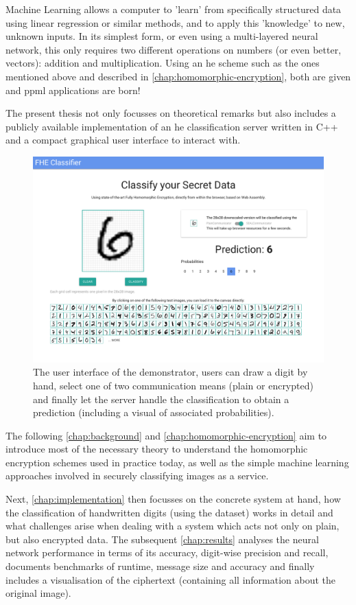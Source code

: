 Machine Learning allows a computer to 'learn' from specifically structured data using linear regression or similar methods, and to apply this 'knowledge' to new, unknown inputs.
In its simplest form, or even using a multi-layered neural network, this only requires two different operations on numbers (or even better, vectors): addition and multiplication.
Using an \gls{he} scheme such as the ones mentioned above and described in \autoref{chap:homomorphic-encryption}, both are given and \gls{ppml} applications are born!

The present thesis not only focusses on theoretical remarks but also includes a publicly available implementation of an \gls{he} classification server written in C++ and a compact graphical user interface to interact with.

\begin{figure}[H]
  \centering
  \label{fig:frontend}
  \includegraphics[width=\linewidth]{figures/frontend.pdf}
  \vspace{-1.2cm}
  \caption{The user interface of the demonstrator, users can draw a digit by hand, select one of two communication means (plain or encrypted) and finally let the server handle the classification to obtain a prediction (including a visual of associated probabilities).}
\end{figure}

The following \autoref{chap:background} and \autoref{chap:homomorphic-encryption} aim to introduce most of the necessary theory to understand the homomorphic encryption schemes used in practice today, as well as the simple machine learning approaches involved in securely classifying images as a service.

Next, \autoref{chap:implementation} then focusses on the concrete system at hand, how the classification of handwritten digits (using the  dataset) works in detail and what challenges arise when dealing with a system which acts not only on plain, but also encrypted data.
The subsequent \autoref{chap:results} analyses the neural network performance in terms of its accuracy, digit-wise precision and recall, documents benchmarks of runtime, message size and accuracy and finally includes a visualisation of the ciphertext (containing all information about the original image).
